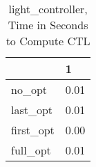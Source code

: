 \begin{table}
\caption{light\_controller, Time in Seconds to Compute CTL}
\label{light_controller_CTL_time}
\begin{tabular}{ll}
\toprule
 & 1 \\
\midrule
no\_opt & 0.01 \\
last\_opt & 0.01 \\
first\_opt & 0.00 \\
full\_opt & 0.01 \\
\bottomrule
\end{tabular}
\end{table}
